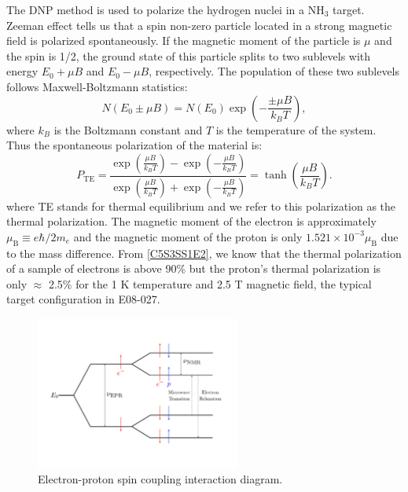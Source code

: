 The DNP method is used to polarize the hydrogen nuclei in a NH${}_3$ target. Zeeman effect tells us that a spin non-zero particle located in a strong magnetic field is polarized spontaneously. If the magnetic moment of the particle is $\mu$ and the spin is 1/2, the ground state of this particle splits to two sublevels with energy $E_0+\mu B$ and $E_0-\mu B$, respectively. The population of these two sublevels follows Maxwell-Boltzmann statistics:
\begin{equation} \label{C5S3SS1E1}
N(E_0\pm\mu B) = N(E_0)\exp(-\frac{\pm\mu B}{k_B T}),
\end{equation}
where $k_B$ is the Boltzmann constant and $T$ is the temperature of the system. Thus the spontaneous polarization of the material is:
\begin{equation} \label{C5S3SS1E2}
P_{\mathrm{TE}} = \frac{\exp(\frac{\mu B}{k_BT})-\exp(-\frac{\mu B}{k_BT})}{\exp(\frac{\mu B}{k_BT})+\exp(-\frac{\mu B}{k_BT})} = \tanh(\frac{\mu B}{k_B T}).
\end{equation}
where TE stands for thermal equilibrium and we refer to this polarization as the thermal polarization. The magnetic moment of the electron is approximately $\mu_{\mathrm{B}}\equiv e\hbar/2m_e$ and the magnetic moment of the proton is only $1.521\times10^{-3}\mu_{\mathrm{B}}$ due to the mass difference. From \cref{C5S3SS1E2}, we know that the thermal polarization of a sample of electrons is above 90\% but the proton's thermal polarization is only $\approx$ 2.5\% for the 1 K temperature and 2.5 T magnetic field, the typical target configuration in E08-027.

\begin{figure}[tb!]
  \centering
  \includegraphics[width=0.6\textwidth]{figs/DNP.pdf}
  \caption[Electron-proton spin coupling interaction diagram.]{Electron-proton spin coupling interaction diagram. \label{C5S3SS1F1}}
\end{figure}

